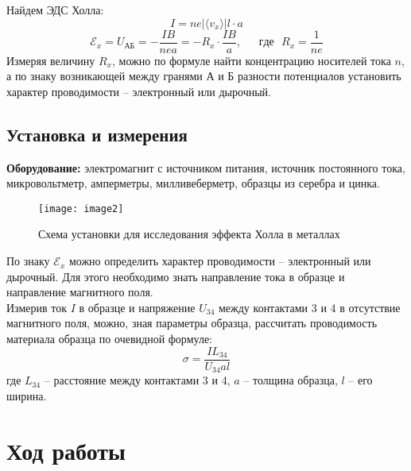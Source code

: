 \documentclass{lab}
\begin{document}
Найдем ЭДС Холла:
$$ I = ne| \langle v_x \rangle |l\cdot a $$
$$ \mathscr{E}_x = U_{АБ} = - \dfrac{IB}{nea} = -R_x \cdot \dfrac{IB}{a}, ~~~~~~~ где ~~~ R_x = \dfrac{1}{ne} $$
Измеряя величину $ R_x $, можно по формуле найти концентрацию носителей тока $ n $, а по
знаку возникающей между гранями А и Б разности потенциалов установить характер проводимости
-- электронный или дырочный.

\newpage

\subsection*{Установка и измерения}

\textbf{Оборудование: } электромагнит с источником питания, источник постоянного тока, микровольтметр,
амперметры, милливеберметр, образцы из серебра и цинка.

\begin{figure}[H]
	\centering
	\texttt{[image: image2]}
	\caption{\footnotesize Схема установки для исследования эффекта Холла в металлах}
\end{figure}

По знаку $ \mathscr{E}_x $ можно определить характер проводимости -- электронный или дырочный. Для этого
необходимо знать направление тока в образце и направление магнитного поля.\\
Измерив ток $ I $ в образце и напряжение $ U_{34} $ между контактами 3 и 4 в отсутствие
магнитного поля, можно, зная параметры образца, рассчитать проводимость материала образца по очевидной формуле:
\begin{equation}
\sigma = \dfrac{IL_{34}}{U_{34}al}
\end{equation}
где $ L_{34} $ -- расстояние между контактами 3 и 4, $ a $ -- толщина образца, $ l $ -- его ширина.

\newpage

\section*{Ход работы}
\end{document}
